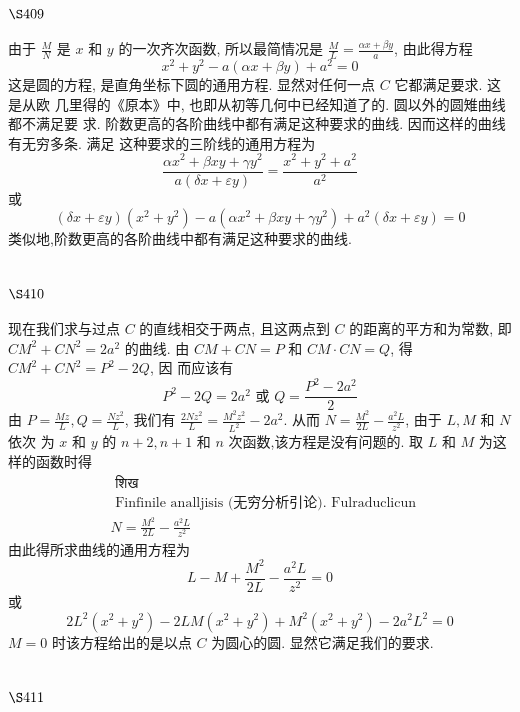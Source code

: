\section{$\S 409$}

由于 $\frac{M}{N}$ 是 $x$ 和 $y$ 的一次齐次函数, 所以最简情况是 $\frac{M}{L}=\frac{\alpha x+\beta y}{a}$, 由此得方程
\[
x^{2}+y^{2}-a(\alpha x+\beta y)+a^{2}=0
\]
这是圆的方程, 是直角坐标下圆的通用方程. 显然对任何一点 $C$ 它都满足要求. 这是从欧 几里得的《原本》中, 也即从初等几何中已经知道了的. 圆以外的圆雉曲线都不满足要 求. 阶数更高的各阶曲线中都有满足这种要求的曲线. 因而这样的曲线有无穷多条. 满足 这种要求的三阶线的通用方程为
\[
\frac{\alpha x^{2}+\beta x y+\gamma y^{2}}{a(\delta x+\varepsilon y)}=\frac{x^{2}+y^{2}+a^{2}}{a^{2}}
\]
或
\[
(\delta x+\varepsilon y)\left(x^{2}+y^{2}\right)-a\left(\alpha x^{2}+\beta x y+\gamma y^{2}\right)+a^{2}(\delta x+\varepsilon y)=0
\]
类似地,阶数更高的各阶曲线中都有满足这种要求的曲线.

\section{$\S 410$}

现在我们求与过点 $C$ 的直线相交于两点, 且这两点到 $C$ 的距离的平方和为常数, 即 $C M^{2}+C N^{2}=2 a^{2}$ 的曲线. 由 $C M+C N=P$ 和 $C M \cdot C N=Q$, 得 $C M^{2}+C N^{2}=P^{2}-2 Q$, 因 而应该有
\[
P^{2}-2 Q=2 a^{2} \text { 或 } Q=\frac{P^{2}-2 a^{2}}{2}
\]
由 $P=\frac{M z}{L}, Q=\frac{N z^{2}}{L}$, 我们有 $\frac{2 N z^{2}}{L}=\frac{M^{2} z^{2}}{L^{2}}-2 a^{2}$. 从而 $N=\frac{M^{2}}{2 L}-\frac{a^{2} L}{z^{2}}$, 由于 $L, M$ 和 $N$ 依次 为 $x$ 和 $y$ 的 $n+2, n+1$ 和 $n$ 次函数,该方程是没有问题的. 取 $L$ 和 $M$ 为这样的函数时得 
\[
\begin{aligned}
& \text { शिख } \\
& \text { Finfinile analljisis (无穷分析引论). Fulraduclicun } \\
& N=\frac{M^{2}}{2 L}-\frac{a^{2} L}{z^{2}}
\end{aligned}
\]
由此得所求曲线的通用方程为
\[
L-M+\frac{M^{2}}{2 L}-\frac{a^{2} L}{z^{2}}=0
\]
或
\[
2 L^{2}\left(x^{2}+y^{2}\right)-2 L M\left(x^{2}+y^{2}\right)+M^{2}\left(x^{2}+y^{2}\right)-2 a^{2} L^{2}=0
\]
$M=0$ 时该方程给出的是以点 $C$ 为圆心的圆. 显然它满足我们的要求.

\section{$\S 411$}

